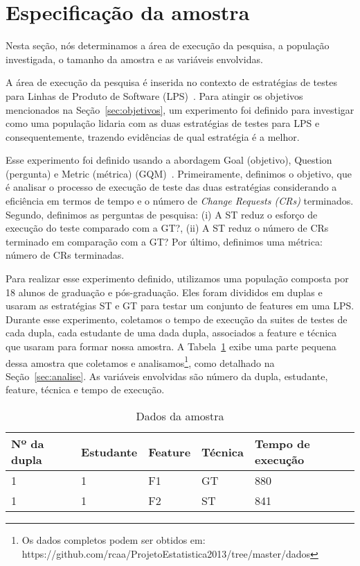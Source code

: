 \section{Especifica\c{c}\~ao da amostra}
\label{sec:especificacao}


Nesta seção, nós determinamos a área de execução da pesquisa, a população investigada, o tamanho da amostra e as variáveis envolvidas.

A área de execução da pesquisa é inserida no contexto de estratégias de testes para Linhas de Produto de Software (LPS)~\cite{pohl-book}. Para atingir os objetivos mencionados na Seção~\ref{sec:objetivos}, um experimento foi definido para investigar como uma população lidaria com as duas estratégias de testes para LPS e consequentemente, trazendo evidências de qual estratégia é a melhor.

Esse experimento foi definido usando a abordagem Goal (objetivo), Question (pergunta) e Metric (métrica) (GQM)~\cite{gqm}. Primeiramente, definimos o objetivo, que é analisar o processo de execução de teste das duas estratégias considerando a eficiência em termos de tempo e o número de \emph{Change Requests (CRs)} terminados. Segundo, definimos as perguntas de pesquisa: (i) A ST reduz o esforço de execução do teste comparado com a GT?, (ii) A ST reduz o número de CRs terminado em comparação com a GT? Por último, definimos uma métrica: número de CRs terminadas.

Para realizar esse experimento definido, utilizamos uma população composta por 18 alunos de graduação e pós-graduação. Eles foram divididos em duplas e usaram as estratégias ST e GT para testar um conjunto de features em uma LPS. Durante esse experimento, coletamos o tempo de execução da suites de testes de cada dupla, cada estudante de uma dada dupla, associados a feature e técnica que usaram para formar nossa amostra. A Tabela~\ref{tab:amostra} exibe uma parte pequena dessa amostra que coletamos e analisamos\footnote{Os dados completos podem ser obtidos em: https://github.com/rcaa/ProjetoEstatistica2013/tree/master/dados}, como detalhado na Seção~\ref{sec:analise}. As variáveis envolvidas são número da dupla, estudante, feature, técnica e tempo de execução.

\begin{table}[h]\footnotesize
    \caption{Dados da amostra}
    \centering
    \begin{tabular}{|l|l|l|l|l|}
    \addlinespace
    \hline
    {\bf Nº da dupla}  & {\bf Estudante} & {\bf Feature} & {\bf Técnica} & {\bf Tempo de execução}\\ \hline
    1 & 1 & F1 & GT & 880\\ \hline
    1 & 1 & F2 & ST & 841\\ \hline
    \end{tabular}
  \label{tab:amostra}
\end{table}

